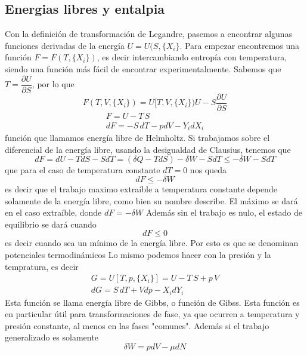 \subsection{Energias libres y entalpia}
Con la definición de transformación de Legandre, pasemos a encontrar algunas funciones derivadas de la energía $U = U(S,\{X_i\}$.
Para empezar encontremos una función $F = F(T,\{X_i\})$, es decir intercambiando entropía con temperatura, siendo una función más fácil de encontrar experimentalmente.
Sabemos que $T = \dfrac{\partial U}{\partial S}$, por lo que
\[ F(T,V,\{X_i\}) = U[T,V,\{X_i\}) U - S \frac{\partial U}{\partial S}\]
\begin{equation}
\begin{gathered}
F = U - T\,S \\
dF = - S\,dT - p d V - Y_i dX_i
\end{gathered}
\label{eq:energia_helmoltz}
\end{equation}
función que llamamos energía libre de Helmholtz.
Si trabajamos sobre el diferencial de la energía libre, usando la desigualdad de Clausius, tenemos que
\[dF = dU - T dS - SdT = (\delta Q - T dS) - \delta W - S dT \leq - \delta W - S dT\]
que para el caso de temperatura constante $dT = 0$ nos queda
\begin{equation}
dF \leq - \delta W
\end{equation}
es decir que el trabajo maximo extraíble a temperatura constante depende solamente de la energía libre, como bien su nombre describe.
El máximo se dará en el caso extraíble, donde $dF = - \delta W$
Además sin el trabajo es nulo, el estado de equilibrio se dará cuando
\begin{equation}
dF \leq 0
\end{equation}
es decir cuando sea un mínimo de la energía libre.
Por esto es que se denominan potenciales termodinámicos
Lo mismo podemos hacer con la presión y la tempratura, es decir
\begin{equation}
\begin{gathered}
G = U[T,p,\{X_i\}] = U - T\,S + p \, V \\
dG = S\,dT + V dp - X_i dY_i
\end{gathered}
\label{eq:energia_gibbs}
\end{equation}
Esta función se llama energía libre de Gibbs, o función de Gibss.
Esta función es en particular útil para transformaciones de fase, ya que ocurren a temperatura y presión constante, al menos en las fases "comunes".
Además si el trabajo generalizado es solamente
\[\delta W = p dV - \mu dN\]
